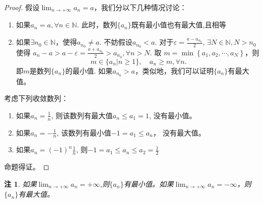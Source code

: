 \documentclass[utf8]{book}
\newtheorem{remark}{注}
\begin{document}
\begin{proof}
假设$\displaystyle \lim_{n\to +\infty}a_n = a$，我们分以下几种情况讨论：
\renewcommand\labelenumi{\normalfont(\theenumi)}
\begin{enumerate}
\item 如果$a_n = a,\forall n\in \mathbb{N}$. 此时，数列$\{a_n\}$既有最小值也有最大值,且相等
\item 如果$\exists n_{0} \in \mathbb{N}$，使得$a_{n_{0}} \neq a$. 不妨假设$a_{n_{0}} < a$. 对于$\varepsilon = \displaystyle\frac{a - a_{n_{0}}}{2}$, $\exists N\in \mathbb {N}, 
N > n_{0}$使得
$a_n - a > a - \varepsilon = \frac{a + a_{n_{0}}}{2} > a_{n_{0}}, \forall n > N$. 取
$m = \min\left\{a_{1}, a_{2}, \cdots, a_{N}\right\}$，则
$$m \in \{a_n | n\geq 1\}, \quad a_n \geq m, \forall n.$$
即$m$是数列$\{a_n\}$的最小值. 如果$a_{n_{0}} > a$，类似地，我们可以证明$\{a_n\}$有最大值。
\end{enumerate}

考虑下列收敛数列：
\renewcommand\labelenumi{\normalfont(\theenumi)}
\begin{enumerate}
\item 如果$a_n = \frac{1}{n}$, 则该数列有最大值$a_n \leq a_1 = 1$, 没有最小值。
\item 如果$a_n = -\frac{1}{n}$, 该数列有最小值$-1 = a_1 \leq a_n$， 没有最大值。
\item 如果$a_n =(-1)^n \frac{1}{n}$, 则$-1 = a_1 \leq a_n \leq a_2 = \frac{1}{2}$ 
\end{enumerate}
命题得证。
\end{proof}
\begin{remark}
如果$\displaystyle \lim_{n\to +\infty}a_n = +\infty$,则$\{a_n\}$有最小值。如果$\displaystyle \lim_{n\to +\infty}a_n = -\infty$，则$\{a_n\}$有最大值。
\end{remark}
\end{document}
